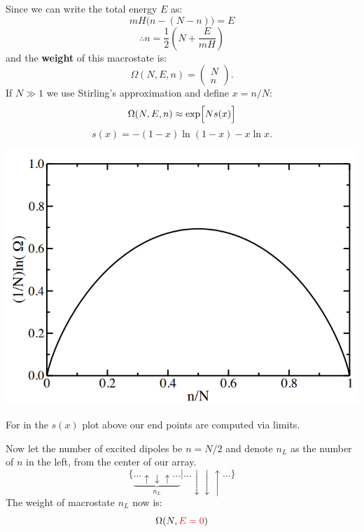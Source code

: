 \documentclass{article}
\begin{document}
\begin{multicols*}{3}
Since we can write the total energy $E$ as:
$$mH\bigl(n-(N-n)\bigr)=E$$
$$\therefore n=\frac{1}{2}\left(N+\frac{E}{mH}\right)$$
and the \textbf{weight} of this macrostate is:
$$\Omega(N,E,n)=\begin{pmatrix}
N \\ n\end{pmatrix}.$$
If $N\gg1$ we use Stirling's approximation
and define $x=n/N$: 
$$\Omega(N,E,n)\approx\exp\Bigl[N s(x)\Bigr]$$
$$s(x)=-(1-x)\ln(1-x)-x\ln x.$$
\begin{center}
    \includegraphics*[scale=0.5]{f00.png}
\end{center}
For in the $s(x)$ plot above
our end points are computed via limits.

Now let the number of excited dipoles be
$n=N/2$ and denote $n_L$ as the number of $n$ in the left,
from the center of our array.
$$\{\underbrace{\dots\uparrow\downarrow\uparrow\dots}
_{\text{$n_L$}}|
\dots\downarrow\downarrow\uparrow\dots\}$$
The weight of macrostate $n_L$ now is:
$$\Omega(N,\textcolor{red}{E=0})$$

\end{multicols*}
\end{document}
